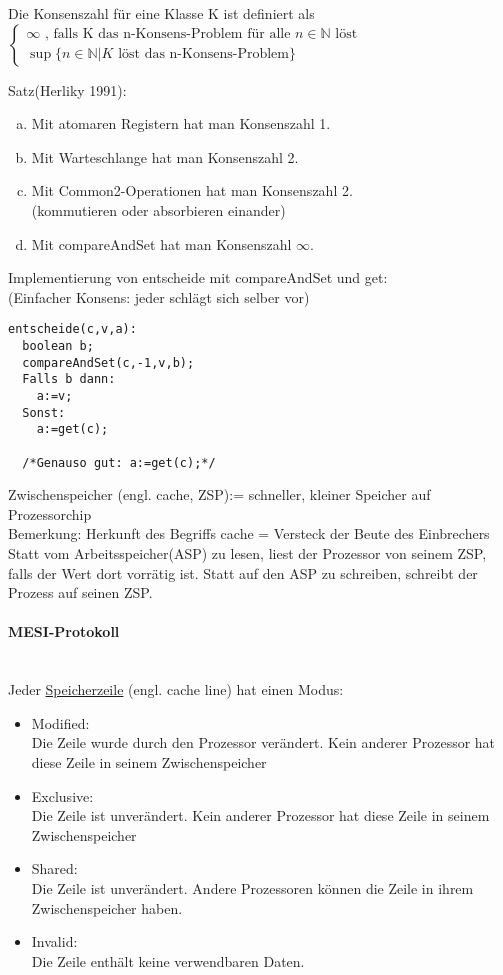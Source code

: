\documentclass[a4paper,12pt]{scrartcl}
\begin{document}
Die Konsenszahl für eine Klasse K ist definiert als\\
$\left\{\begin{array}{l}
         \infty \text{ , falls K das n-Konsens-Problem für alle } n\in\mathbb{N} \text{ löst}\\
         \sup\{n\in\mathbb{N}| K \text{ löst das n-Konsens-Problem}\}
        \end{array}\right.
$

Satz(Herliky 1991):
\begin{enumerate}[(a)]
 \item Mit atomaren Registern hat man Konsenszahl 1.
 \item Mit Warteschlange hat man Konsenszahl 2.
 \item Mit Common2-Operationen  hat man Konsenszahl 2.\\
 (kommutieren oder absorbieren einander)
 \item Mit compareAndSet hat man Konsenszahl $\infty$.
 \end{enumerate}
 
Implementierung von entscheide mit compareAndSet und get:\\
(Einfacher Konsens: jeder schlägt sich selber vor)
\begin{lstlisting}
entscheide(c,v,a):
  boolean b;
  compareAndSet(c,-1,v,b);
  Falls b dann:
    a:=v;
  Sonst:
    a:=get(c);
    
  /*Genauso gut: a:=get(c);*/
\end{lstlisting}

Zwischenspeicher (engl. cache, ZSP):= schneller, kleiner Speicher auf Prozessorchip\\
Bemerkung: Herkunft des Begriffs cache = Versteck der Beute des Einbrechers\\
Statt vom Arbeitsspeicher(ASP) zu lesen, liest der Prozessor von seinem ZSP, falls der Wert dort vorrätig ist. Statt auf den ASP zu schreiben, schreibt der Prozess auf seinen ZSP. 

\paragraph{MESI-Protokoll}\quad\\
Jeder \underline{Speicherzeile} (engl. cache line) hat einen Modus:
\begin{itemize}
 \item Modified:\\
 Die Zeile wurde durch den Prozessor verändert. Kein anderer Prozessor hat diese Zeile in seinem Zwischenspeicher
 \item Exclusive:\\
 Die Zeile ist unverändert. Kein anderer Prozessor hat diese Zeile in seinem Zwischenspeicher
 \item Shared:\\
 Die Zeile ist unverändert. Andere Prozessoren können die Zeile in ihrem Zwischenspeicher haben.
 \item Invalid:\\
 Die Zeile enthält keine verwendbaren Daten.
\end{itemize}
\end{document}
